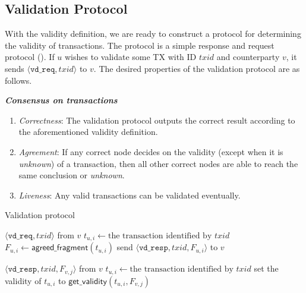 \subsection{Validation Protocol}
With the validity definition, we are ready to construct a protocol for determining the validity of transactions.
The protocol is a simple response and request protocol ().
If $u$ wishes to validate some TX with ID $txid$ and counterparty $v$, it sends $\langle \texttt{vd\_req}, txid \rangle$ to $v$.
The desired properties of the validation protocol are as follows.
\begin{definition}
\label{def:validation}
\textbf{\emph{Consensus on transactions}}

\begin{enumerate}
    \item \emph{Correctness}:
        The validation protocol outputs the correct result
        according to the aforementioned validity definition.
    \item \emph{Agreement}:
        If any correct node decides on the validity (except when it is \emph{unknown}) of a transaction,
        then all other correct nodes are able to reach the same conclusion or \emph{unknown}.
    \item \emph{Liveness}:
        Any valid transactions can be validated eventually.
\end{enumerate}
\end{definition}

\begin{algorithm}
\caption{Validation protocol}
\label{alg:vd-proto}

\begin{algorithmic}
    \Upon $\langle \texttt{vd\_req}, txid \rangle$ from $v$
        \State $t_{u, i} \gets \text{the transaction identified by } txid$
        \State $F_{u, i} \gets \textsf{agreed\_fragment}(t_{u, i})$
        \State send $\langle \texttt{vd\_resp}, txid, F_{u, i} \rangle$ to $v$

    \Upon $\langle \texttt{vd\_resp}, txid, F_{v, j} \rangle$ from $v$
        \State $t_{u, i} \gets \text{the transaction identified by } txid$
        \State set the validity of $t_{u, i}$ to $\textsf{get\_validity}(t_{u, i}, F_{v, j})$
\end{algorithmic}
\end{algorithm}

